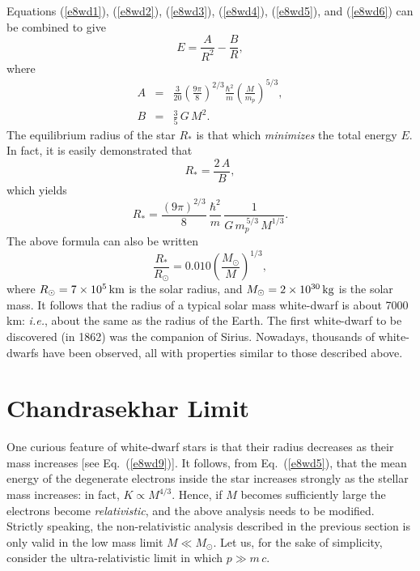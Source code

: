 Equations (\ref{e8wd1}), (\ref{e8wd2}), (\ref{e8wd3}), (\ref{e8wd4}),
(\ref{e8wd5}), and (\ref{e8wd6}) can be combined to give
\begin{equation}
E = \frac{A}{R^2} - \frac{B}{R},
\end{equation}
where
\begin{eqnarray}
A &=& \frac{3}{20}\left(\frac{9\pi}{8}\right)^{2/3}\frac{\hbar^2}{m}
\left(\frac{M}{m_p}\right)^{5/3},\\[0.5ex]
B&=& \frac{3}{5}\,G\,M^2.
\end{eqnarray}
The equilibrium radius of the star $R_\ast$ is that which
{\em minimizes} the total energy $E$. In fact,
it is easily demonstrated that
\begin{equation}
R_\ast = \frac{2\,A}{B},
\end{equation}
which yields
\begin{equation}
R_\ast = \frac{(9\pi)^{2/3}}{8}\,\frac{\hbar^2}{m}\,\frac{1}{G\,m_p^{\,5/3}\,
M^{1/3}}.
\end{equation}
The above formula can also be written
\begin{equation}
\frac{R_\ast}{R_\odot}= 0.010\left(\frac{M_\odot}{M}\right)^{1/3},\label{e8wd9}
\end{equation}
where $R_\odot= 7\times 10^5\,{\rm km}$ is the solar radius, and
$M_\odot = 2\times 10^{30}\,{\rm kg}$ is the solar mass. It follows that
the radius of a typical solar mass white-dwarf is about 7000\,km: 
{\em i.e.}, about the same as the radius of the Earth. The first
white-dwarf to be discovered (in 1862) was the companion of Sirius. Nowadays,
thousands of white-dwarfs have been observed, all with properties similar
to those described above.

\section{Chandrasekhar Limit}
One curious feature of white-dwarf stars is that their radius decreases
as their mass increases [see Eq.~(\ref{e8wd9})]. It follows, from Eq.~(\ref{e8wd5}),
that the mean energy of the degenerate electrons inside the
star increases strongly as the stellar
mass increases: in fact, $K\propto M^{4/3}$. Hence, if 
$M$ becomes sufficiently large  the electrons become {\em relativistic}, and
the above analysis needs to be modified. Strictly speaking, the non-relativistic
analysis described in the previous section
 is only valid in the low mass limit $M\ll M_\odot$. 
Let us, for the sake of simplicity, consider the ultra-relativistic
limit in which $p\gg m\,c$. 

